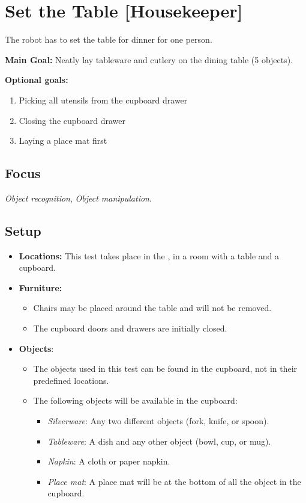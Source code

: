 \section{Set the Table [Housekeeper]}
\label{test:set-the-table}
The robot has to set the table for dinner for one person.


\noindent \textbf{Main Goal:} Neatly lay tableware and cutlery on the dining table (5 objects).

\noindent \textbf{Optional goals:}
\begin{enumerate}[nosep]
	\item Picking all utensils from the cupboard drawer
	\item Closing the cupboard drawer
	\item Laying a place mat first
\end{enumerate}

\subsection*{Focus}
\emph{Object recognition}, \emph{Object manipulation}.


\subsection*{Setup}
\begin{itemize}[nosep]
	\item \textbf{Locations:} This test takes place in the \Arena{}, in a room with a table and a cupboard.
	\item \textbf{Furniture:}
		\begin{itemize}
		 \item Chairs may be placed around the table and will not be removed.
		 \item The cupboard doors and drawers are initially closed.
		\end{itemize}
	\item \textbf{Objects}: 
	\begin{itemize}
		 \item 	The objects used in this test can be found in the cupboard, not in their predefined locations.
		 \item The following objects will be available in the cupboard:
		 \begin{itemize}
			\item\textit{Silverware}: Any two different objects (fork, knife, or spoon).
			\item\textit{Tableware}: A dish and any other object (bowl, cup, or mug).
			\item\textit{Napkin}: A cloth or paper napkin.
			\item\textit{Place mat}: A place mat will be at the bottom of all the object in the cupboard.
		 \end{itemize}
		 
		\end{itemize}
\end{itemize}

